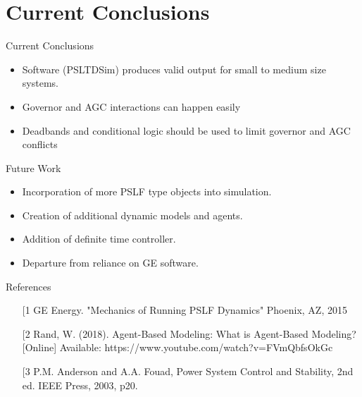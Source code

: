 \documentclass[14pt, unknownkeysallowed]{beamer}
\begin{document}
\section{Current Conclusions}
\begin{frame}
Current Conclusions
\begin{itemize}
	\item Software (PSLTDSim) produces valid output for small to medium size systems.
	\item Governor and AGC interactions can happen easily
	\item Deadbands and conditional logic should be used to limit governor and AGC conflicts
\end{itemize}
\end{frame}
\begin{frame}
Future Work
\begin{itemize}
\item Incorporation of more PSLF type objects into simulation.
\item Creation of additional dynamic models and agents.
\item Addition of definite time controller.
\item Departure from reliance on GE software.
\end{itemize}
\end{frame}
\begin{frame}
References\vspace{1em}\\
\begin{minipage}{\textwidth}
\footnotesize
\begin{itemize}
\item[[1] GE Energy. "Mechanics of Running PSLF Dynamics" Phoenix, AZ, 2015
\item[[2] Rand, W. (2018). Agent-Based Modeling: What is Agent-Based Modeling? [Online] Available: https://www.youtube.com/watch?v=FVmQbfsOkGc
\item[[3] P.M. Anderson and A.A. Fouad, Power System Control and Stability, 2nd ed. IEEE Press, 2003, p20.
\end{itemize}
\end{minipage}
\end{frame}
\end{document}
